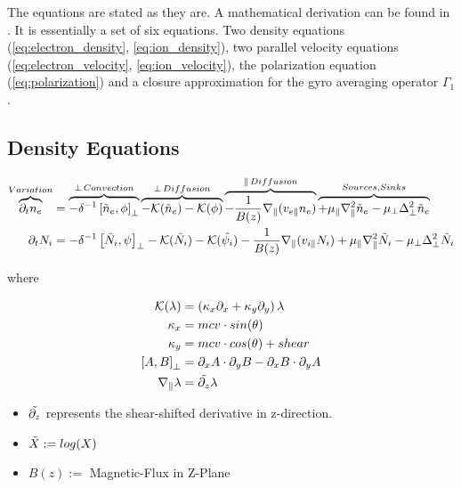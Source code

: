 \documentclass[master.tex]{subfiles}
\begin{document}
The equations are stated as they are. A mathematical derivation can be found in \cite{HeldDisseration}. It is essentially a set of six equations. Two density equations (\autoref{eq:electron_density}, \autoref{eq:ion_density}), two parallel velocity equations (\autoref{eq:electron_velocity}, \autoref{eq:ion_velocity}), the polarization equation (\autoref{eq:polarization}) and a closure approximation for the gyro averaging operator $\Gamma_1$.

\subsection{Density Equations}

\begin{align}
    \overbrace{\partial_t n_e}^{Variation} &=
    \overbrace{-\delta^{-1} \left[\Tilde{n}_e, \phi \right]_{\perp}}^{\perp \, Convection}
    \overbrace{
    - \mathcal{K}(\Tilde{n}_e)
    - \mathcal{K}(\phi)
    }^{\perp \, Diffusion}
    \overbrace{
    - \frac{1}{B(z)}\nabla_\parallel (v_{e\parallel} n_e)
    }^{\parallel \, Diffusion}
    \overbrace{
    + \mu_\parallel \nabla_\parallel^2\Tilde{n}_e
    - \mu_\perp \Delta^2_\perp\Tilde{n}_e
    }^{Sources, Sinks}
    \label{eq:electron_density}
    \\
    \partial_t N_i &=
    -\delta^{-1} \left[\Tilde{N}_i, \psi \right]_{\perp}
    - \mathcal{K}(\Tilde{N}_i)
    - \mathcal{K}(\Tilde{\psi_i})
    - \frac{1}{B(z)}\nabla_\parallel (v_{i\parallel} N_i)
    + \mu_\parallel \nabla_\parallel^2\Tilde{N}_i
    - \mu_\perp \Delta^2_\perp\Tilde{N}_i \label{eq:ion_density}
\end{align}

where

\begin{align}
    \mathcal{K}(\lambda) &= (\kappa_x \partial_x + \kappa_y \partial_y)\,\lambda\\
    \kappa_x &= mcv \cdot sin(\theta)\\
    \kappa_y &= mcv \cdot cos(\theta) + shear\\
    \left[A, B\right]_\perp &= \partial_x A \cdot \partial_y B - \partial_x B \cdot \partial_y A\\
    \nabla_\parallel \lambda &= \Tilde{\partial_{z}} \lambda
\end{align}
\begin{itemize}
    \item $\Tilde{\partial_{z}}$ represents the shear-shifted derivative in z-direction.
    \item $\Tilde{X} := log(X)$
    \item $B(z) := $ Magnetic-Flux in Z-Plane
\end{itemize}
\end{document}
